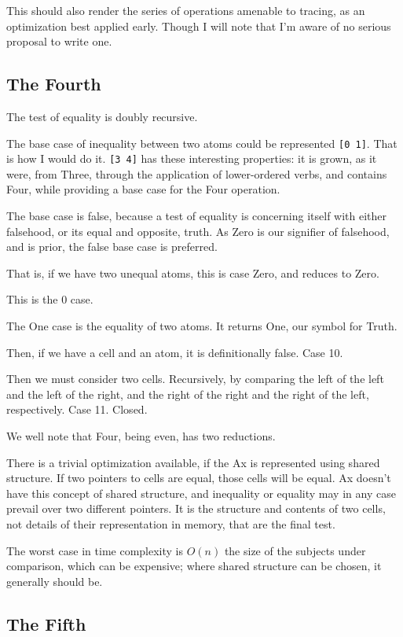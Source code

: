 \documentclass[twoside]{article}
\begin{document}
This should also render the series of operations amenable to tracing, as an optimization best applied early. Though I will note that I'm aware of no serious proposal to write one.

\subsection{The Fourth}

The test of equality is doubly recursive.

The base case of inequality between two atoms could be represented \lstinline[style=inlinecode]{[0 1]}.  That is how I would do it.  \lstinline[style=inlinecode]{[3 4]} has these interesting properties: it is grown, as it were, from Three, through the application of lower-ordered verbs, and contains Four, while providing a base case for the Four operation.

The base case is false, because a test of equality is concerning itself with either falsehood, or its equal and opposite, truth. As Zero is our signifier of falsehood, and is prior, the false base case is preferred.

That is, if we have two unequal atoms, this is case Zero, and reduces to Zero.

This is the 0 case.

The One case is the equality of two atoms. It returns One, our symbol for Truth.

Then, if we have a cell and an atom, it is definitionally false. Case 10.

Then we must consider two cells. Recursively, by comparing the left of the left and the left of the right, and the right of the right and the right of the left, respectively. Case 11. Closed.

We well note that Four, being even, has two reductions.

There is a trivial optimization available, if the Ax is represented using shared structure. If two pointers to cells are equal, those cells will be equal. Ax doesn't have this concept of shared structure, and inequality or equality may in any case prevail over two different pointers. It is the structure and contents of two cells, not details of their representation in memory, that are the final test.

The worst case in time complexity is $O(n)$ the size of the subjects under comparison, which can be expensive; where shared structure can be chosen, it generally should be.

\subsection{The Fifth}
\end{document}
